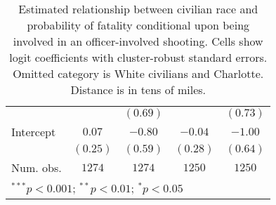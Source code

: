 \begin{table}[ht!]
\begin{center}
\begin{tabular}{l c c c c}
               &             & $(0.69)$    &             & $(0.73)$    \\
Intercept      & $0.07$      & $-0.80$     & $-0.04$     & $-1.00$     \\
               & $(0.25)$    & $(0.59)$    & $(0.28)$    & $(0.64)$    \\
\midrule
Num. obs.      & $1274$      & $1274$      & $1250$      & $1250$      \\
\bottomrule
\multicolumn{5}{l}{\scriptsize{$^{***}p<0.001$; $^{**}p<0.01$; $^{*}p<0.05$}}
\end{tabular}
\caption{Estimated relationship between civilian race and probability of fatality conditional upon being involved in an officer-involved shooting. Cells show logit coefficients with cluster-robust standard errors. Omitted category is White civilians and Charlotte. Distance is in tens of miles.}
\label{tab:mainLogitTable}
\end{center}
\end{table}
